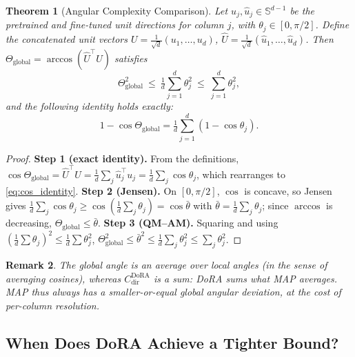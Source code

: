 \documentclass[11pt]{article}
\newtheorem{theorem}{Theorem}[section]
\newtheorem{remark}[theorem]{Remark}
\newcommand{\Sd}{\mathbb{S}^{d-1}}
\newcommand{\Thetaglob}{\Theta_{\mathrm{global}}}
\begin{document}
\setcounter{theorem}{9} %
\begin{theorem}[Angular Complexity Comparison]\label{thm:comparison}
Let $u_j,\hat u_j\in\Sd$ be the pretrained and fine-tuned unit directions for column
$j$, with $\theta_j\in[0,\pi/2]$. Define the concatenated unit vectors
$U=\frac1{\sqrt d}(u_1,\dots,u_d)$, $\hat U=\frac1{\sqrt d}(\hat u_1,\dots,\hat u_d)$.
Then $\Thetaglob=\arccos(\hat U^\top U)$ satisfies
\begin{equation}\label{eq:thm_comparison}
\Thetaglob^2\ \le\ \tfrac1d\sum_{j=1}^d\theta_j^2\ \le\ \sum_{j=1}^d\theta_j^2,
\end{equation}
and the following identity holds \emph{exactly}:
\begin{equation}\label{eq:cos_identity}
1-\cos\Thetaglob=\tfrac1d\sum_{j=1}^d(1-\cos\theta_j).
\end{equation}
\end{theorem}
\begin{proof}
\textbf{Step 1 (exact identity).} From the definitions,
$\cos\Thetaglob=\hat U^\top U=\frac1d\sum_j\hat u_j^\top u_j=\frac1d\sum_j\cos\theta_j$,
which rearranges to \eqref{eq:cos_identity}.
\textbf{Step 2 (Jensen).} On $[0,\pi/2]$, $\cos$ is concave, so Jensen gives
$\frac1d\sum_j\cos\theta_j\ge\cos(\frac1d\sum_j\theta_j)=\cos\bar\theta$ with
$\bar\theta=\frac1d\sum_j\theta_j$; since $\arccos$ is decreasing,
$\Thetaglob\le\bar\theta$.
\textbf{Step 3 (QM--AM).} Squaring and using $(\frac1d\sum\theta_j)^2\le\frac1d\sum\theta_j^2$,
$\Thetaglob^2\le\bar\theta^2\le\frac1d\sum_j\theta_j^2\le\sum_j\theta_j^2$.
\end{proof}

\begin{remark}\label{rem:comparison}
The global angle is an \emph{average} over local angles (in the sense of averaging
cosines), whereas $C^{\mathrm{DoRA}}_{\mathrm{dir}}$ is a \emph{sum}: DoRA sums what
MAP averages. MAP thus always has a smaller-or-equal global angular deviation, at the
cost of per-column resolution.
\end{remark}

\subsection{When Does DoRA Achieve a Tighter Bound?}
\label{sec:dora_advantage}
\end{document}

